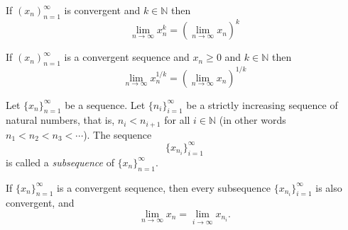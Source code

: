 \documentclass[../main.tex]{subfiles}
\begin{document}
    
    
    
    \begin{exercise}
    If $ (x_n)^\infty_{n=1}$ is convergent and $ k \in \mathbb{N}$ then
    \[
    \lim_{n \to \infty}{x_n^k} = \left( \lim_{n \to \infty}{x_n}\right)^k
    \]
    \end{exercise}
    
    
    
    
    
    
    
    
    \begin{exercise}
    If $ (x_n)^\infty_{n=1}$ is a convergent sequence and $ x_n \geq 0 $ and $ k \in \mathbb{N}$ then
    \[
    \lim_{n \to \infty}{x_n^{1/k}} = \left( \lim_{n \to \infty}{x_n}\right)^{1/k}
    \]
    \end{exercise}
    
    
    
    
    
    
    
    
    
    
    \begin{definition} \label{def:subsequence}
    Let \( \{x_n\}_{n=1}^{\infty} \) be a sequence. Let \( \{n_i\}_{i=1}^{\infty} \) be a strictly increasing sequence of natural numbers, that is, \( n_i < n_{i+1} \) for all \( i \in \mathbb{N} \) (in other words \( n_1 < n_2 < n_3 < \cdots \)). The sequence
    \[
    \{x_{n_i}\}_{i=1}^{\infty}
    \]
    is called a \textit{subsequence} of \( \{x_n\}_{n=1}^{\infty} \).
    \end{definition}
    
    
    
    
    
    
    
    
    
    
    
    
    
    
    
    
    
    
    
    
    
    
    \begin{proposition} \label{prp:subsequence limit equal to limit}
    If \( \{x_n\}_{n=1}^{\infty} \) is a convergent sequence, then every subsequence \( \{x_{n_i}\}_{i=1}^{\infty} \) is also convergent, and
    \[
    \lim_{n \to \infty} x_n = \lim_{i \to \infty} x_{n_i}.
    \]
    \end{proposition}
    
\end{document}
